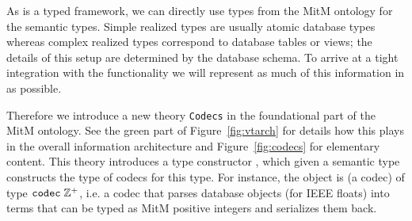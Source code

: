 As \ommt is a typed framework, we can directly use \ommt types from the MitM ontology for the semantic types. 
Simple realized types are usually atomic database types whereas complex realized types correspond to database tables or views; the details of this setup are determined by the database schema. 
To arrive at a tight integration with the \ommt functionality we will represent as much of this information in \ommt as possible.

Therefore we introduce a new \ommt theory \texttt{Codecs} in the foundational part of the MitM ontology.  
See the green part of Figure~\ref{fig:vtarch} for details how this plays in the overall information architecture and Figure~\ref{fig:codecs} for elementary content. 
This theory introduces a type constructor \codectt, which given a semantic type constructs the type of codecs for this type. 
For instance, the object  is (a codec) of type $\codectt\;\mathbb{Z}^+$, i.e. a codec that parses database objects (for \lmfdb IEEE floats) into \ommt terms that can be typed as MitM positive integers and serializes them back.

